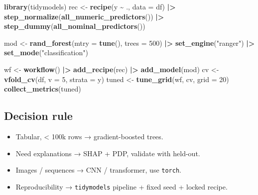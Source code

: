 \documentclass[
]{article}
\newenvironment{Shaded}{\begin{snugshade}}{\end{snugshade}}
\newcommand{\AttributeTok}[1]{\textcolor[rgb]{0.13,0.29,0.53}{#1}}
\newcommand{\DecValTok}[1]{\textcolor[rgb]{0.00,0.00,0.81}{#1}}
\newcommand{\FunctionTok}[1]{\textcolor[rgb]{0.13,0.29,0.53}{\textbf{#1}}}
\newcommand{\NormalTok}[1]{#1}
\newcommand{\OtherTok}[1]{\textcolor[rgb]{0.56,0.35,0.01}{#1}}
\newcommand{\SpecialCharTok}[1]{\textcolor[rgb]{0.81,0.36,0.00}{\textbf{#1}}}
\newcommand{\StringTok}[1]{\textcolor[rgb]{0.31,0.60,0.02}{#1}}
\providecommand{\tightlist}{%
  \setlength{\itemsep}{0pt}\setlength{\parskip}{0pt}}
\begin{document}
\begin{Shaded}
\begin{Highlighting}[]
\FunctionTok{library}\NormalTok{(tidymodels)}
\NormalTok{rec  }\OtherTok{\textless{}{-}} \FunctionTok{recipe}\NormalTok{(y }\SpecialCharTok{\textasciitilde{}}\NormalTok{ ., }\AttributeTok{data =}\NormalTok{ df) }\SpecialCharTok{|\textgreater{}}
  \FunctionTok{step\_normalize}\NormalTok{(}\FunctionTok{all\_numeric\_predictors}\NormalTok{()) }\SpecialCharTok{|\textgreater{}}
  \FunctionTok{step\_dummy}\NormalTok{(}\FunctionTok{all\_nominal\_predictors}\NormalTok{())}

\NormalTok{mod  }\OtherTok{\textless{}{-}} \FunctionTok{rand\_forest}\NormalTok{(}\AttributeTok{mtry =} \FunctionTok{tune}\NormalTok{(), }\AttributeTok{trees =} \DecValTok{500}\NormalTok{) }\SpecialCharTok{|\textgreater{}}
  \FunctionTok{set\_engine}\NormalTok{(}\StringTok{"ranger"}\NormalTok{) }\SpecialCharTok{|\textgreater{}} \FunctionTok{set\_mode}\NormalTok{(}\StringTok{"classification"}\NormalTok{)}

\NormalTok{wf   }\OtherTok{\textless{}{-}} \FunctionTok{workflow}\NormalTok{() }\SpecialCharTok{|\textgreater{}} \FunctionTok{add\_recipe}\NormalTok{(rec) }\SpecialCharTok{|\textgreater{}} \FunctionTok{add\_model}\NormalTok{(mod)}
\NormalTok{cv   }\OtherTok{\textless{}{-}} \FunctionTok{vfold\_cv}\NormalTok{(df, }\AttributeTok{v =} \DecValTok{5}\NormalTok{, }\AttributeTok{strata =}\NormalTok{ y)}
\NormalTok{tuned }\OtherTok{\textless{}{-}} \FunctionTok{tune\_grid}\NormalTok{(wf, cv, }\AttributeTok{grid =} \DecValTok{20}\NormalTok{)}
\FunctionTok{collect\_metrics}\NormalTok{(tuned)}
\end{Highlighting}
\end{Shaded}

\subsection{Decision rule}\label{decision-rule-13}

\begin{itemize}
\tightlist
\item
  Tabular, \textless{} 100k rows → gradient-boosted trees.
\item
  Need explanations → SHAP + PDP, validate with held-out.
\item
  Images / sequences → CNN / transformer, use \texttt{torch}.
\item
  Reproducibility → \texttt{tidymodels} pipeline + fixed seed + locked
  recipe.
\end{itemize}
\end{document}

